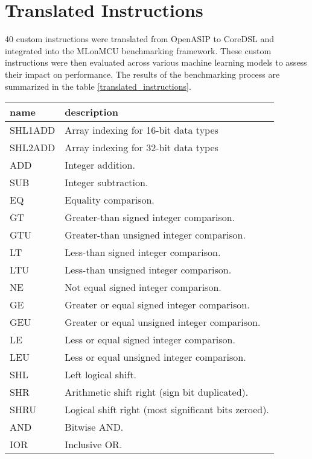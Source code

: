\section{Translated Instructions}

40 custom instructions were translated from OpenASIP to CoreDSL and integrated into the MLonMCU benchmarking framework. These custom instructions were then evaluated across various machine learning models to assess their impact on performance. The results of the benchmarking process are summarized in the table \ref{translated_instructions}.

\begin{table}[htbp]
    \centering
    \begin{tabularx}{\textwidth}{|l|X|}
    \hline
    \textbf{name} & \textbf{description} \\ \hline
    SHL1ADD & Array indexing for 16-bit data types \\ \hline
    SHL2ADD & Array indexing for 32-bit data types \\ \hline
    ADD & Integer addition.  \\ \hline
    SUB & Integer subtraction.  \\ \hline
    EQ & Equality comparison.  \\ \hline
    GT & Greater-than signed integer comparison.  \\ \hline
    GTU & Greater-than unsigned integer comparison.  \\ \hline
    LT & Less-than signed integer comparison. \\ \hline
    LTU & Less-than unsigned integer comparison. \\ \hline
    NE & Not equal signed integer comparison. \\ \hline
    GE & Greater or equal signed integer comparison. \\ \hline
    GEU & Greater or equal unsigned integer comparison. \\ \hline
    LE & Less or equal signed integer comparison. \\ \hline
    LEU & Less or equal unsigned integer comparison. \\ \hline
    SHL & Left logical shift. \\ \hline
    SHR & Arithmetic shift right (sign bit duplicated). \\ \hline
    SHRU & Logical shift right (most significant bits zeroed). \\ \hline
    AND & Bitwise AND.  \\ \hline
    IOR & Inclusive OR.  \\ \hline

\end{tabularx}
\end{table}
